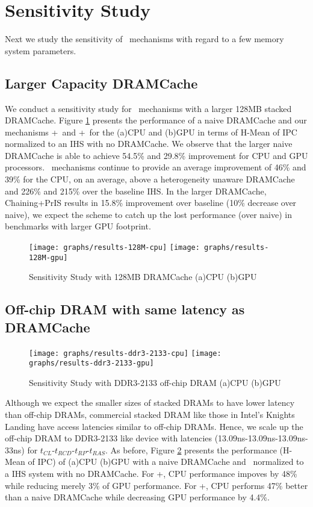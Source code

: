 \section{Sensitivity Study} \label{sensitivity-results}

Next we study the sensitivity of \cachename\ mechanisms with regard to a few memory system parameters.

\subsection{Larger Capacity DRAMCache}

We conduct a sensitivity study for \cachename\ mechanisms with a larger 128MB stacked DRAMCache. Figure \ref{results-128m} presents the performance of a naive DRAMCache and our mechanisms \bypassname+\prioname\ and \chaining+\prioname\ for the (a)CPU and (b)GPU in terms of H-Mean of IPC normalized to an IHS with no DRAMCache. We observe that the larger naive DRAMCache is able to achieve 54.5\% and 29.8\% improvement for CPU and GPU processors. \cachename\ mechanisms continue to provide an average improvement of 46\% and 39\% for the CPU, on an average, above a heterogeneity unaware DRAMCache and 226\% and 215\% over the baseline IHS. 
In the larger DRAMCache, Chaining+PrIS results in 15.8\% improvement over baseline (10\% decrease over naive), we
expect the scheme to catch up the lost performance (over naive) in benchmarks with larger GPU footprint.

\begin{figure}[!htb]
	\centering
	\texttt{[image: graphs/results-128M-cpu]}
	\texttt{[image: graphs/results-128M-gpu]}
	\caption{Sensitivity Study with 128MB DRAMCache (a)CPU (b)GPU}
	\label{results-128m}
\end{figure}


\subsection{Off-chip DRAM with same latency as DRAMCache}

\begin{figure}[!htb]
	\centering
	\texttt{[image: graphs/results-ddr3-2133-cpu]}
	\texttt{[image: graphs/results-ddr3-2133-gpu]}
	\caption{Sensitivity Study with DDR3-2133 off-chip DRAM (a)CPU (b)GPU}
	\label{results-2xbw}
\end{figure}

Although we expect the smaller sizes of stacked DRAMs to have lower latency than off-chip DRAMs, commercial stacked DRAM like those in Intel's Knights Landing \cite{xeonphi} have access latencies similar to off-chip DRAMs. Hence, we scale up the off-chip DRAM to DDR3-2133 like device with latencies (13.09ns-13.09ns-13.09ns-33ns) for $t_{CL}$-$t_{RCD}$-$t_{RP}$-$t_{RAS}$. As before, Figure \ref{results-2xbw} presents the performance (H-Mean of IPC) of (a)CPU (b)GPU with a naive DRAMCache and \cachename\ normalized to a IHS system with no DRAMCache. For \prioname+\bypassname, CPU performance impoves by 48\% while reducing merely 3\% of GPU performance. For \prioname+\chaining, CPU performs 47\% better than a naive DRAMCache while decreasing GPU performance by 4.4\%.

